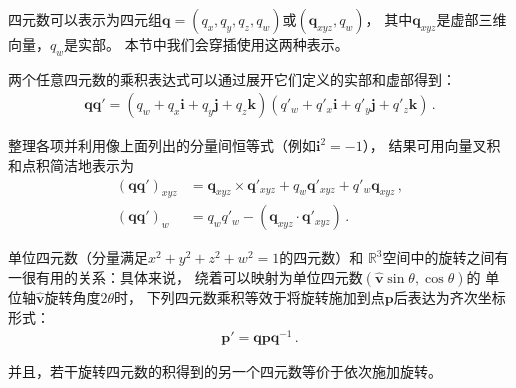 四元数可以表示为四元组$\bm q=(q_x,q_y,q_z,q_w)$或$(\bm q_{xyz},q_w)$，
其中$\bm q_{xyz}$是虚部三维向量，$q_w$是实部。
本节中我们会穿插使用这两种表示。

两个任意四元数的乘积表达式可以通过展开它们定义的实部和虚部得到：
\begin{align*}
    \bm q\bm q'=(q_w+q_x\mathbf{i}+q_y\mathbf{j}+q_z\mathbf{k})(q'_w+q'_x\mathbf{i}+q'_y\mathbf{j}+q'_z\mathbf{k})\, .
\end{align*}

整理各项并利用像上面列出的分量间恒等式（例如$\mathbf{i}^2=-1$），
结果可用向量叉积和点积简洁地表示为
\begin{align}
    (\bm q\bm q')_{xyz} & =\bm q_{xyz}\times\bm q'_{xyz}+q_w\bm q'_{xyz}+q'_w\bm q_{xyz}\nonumber\, , \\
    (\bm q\bm q')_w     & =q_wq'_w-(\bm q_{xyz}\cdot\bm q'_{xyz})\, .
\end{align}

单位四元数（分量满足$x^2+y^2+z^2+w^2=1$的四元数）和
$\mathbb{R}^3$空间中的旋转之间有一很有用的关系：具体来说，
绕着可以映射为单位四元数$(\hat{\bm v}\sin\theta,\cos\theta)$的
单位轴$\hat{\bm v}$旋转角度$2\theta$时，
下列四元数乘积等效于将旋转施加到点$\bm p$后表达为齐次坐标形式：
\begin{align*}
    \bm p'=\bm q\bm p\bm q^{-1}\, .
\end{align*}

并且，若干旋转四元数的积得到的另一个四元数等价于依次施加旋转。

